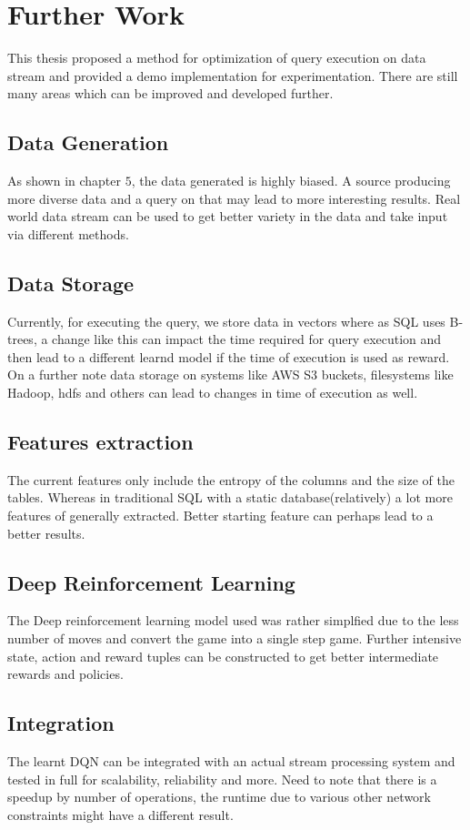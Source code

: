 \section{Further Work}
This thesis proposed a method for optimization of query execution on data stream and provided a demo implementation for experimentation. There are still many areas which can be improved and developed further.

\subsection{Data Generation}
As shown in chapter $5$, the data generated is highly biased. A source producing more diverse data and a query on that may lead to more interesting results. Real world data stream can be used to get better variety in the data and take input via different methods.

\subsection{Data Storage}
Currently, for executing the query, we store data in vectors where as SQL uses B-trees, a change like this can impact the time required for query execution and then lead to a different learnd model if the time of execution is used as reward.\\
On a further note data storage on systems like AWS S3 buckets, filesystems like Hadoop, hdfs and others can lead to changes in time of execution as well.

\subsection{Features extraction}
The current features only include the entropy of the columns and the size of the tables. Whereas in traditional SQL with a static database(relatively) a lot more features of generally extracted. Better starting feature can perhaps lead to a better results. 

\subsection{Deep Reinforcement Learning}
The Deep reinforcement learning model used was rather simplfied due to the less number of moves and convert the game into a single step game. Further intensive state, action and reward tuples can be constructed to get better intermediate rewards and policies. 

\subsection{Integration} 
The learnt DQN can be integrated with an actual stream processing system and tested in full for scalability, reliability and more. Need to note that there is a speedup by number of operations, the runtime due to various other network constraints might have a different result. 
